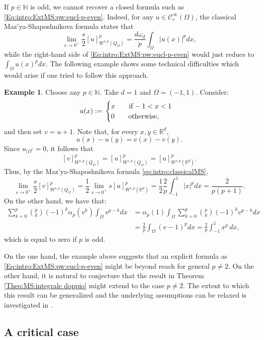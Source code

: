 \documentclass[reqno,11pt]{amsart}
\numberwithin{equation}{section}
\theoremstyle{definition} %
\newtheorem{example}{Example}[section]
\theoremstyle{plain}
\theoremstyle{definition}
\theoremstyle{remark}
\def\C{\mathcal{C}}
\def\Qom{{Q_\Omega}}
\def\O{\Omega}
\def\io{\int_\Omega}
\def\semin#1#2{ [#1 ]_{#2}}
\def\N{\mathbb{N}}
\def\Rd{\mathbb{R}^d}
\newcommand{\abs}[1]{\left|#1\right|}
\begin{document}
If $p\in\N$ is odd, we cannot recover a closed formula such as \eqref{Eq:intro:ExtMS:pw:eucl-p-even}. Indeed, for any $u\in\C^\infty_c(\Omega)$, the classical Maz'ya-Shaposhnikova formula states that
\[
\lim_{s\to0^+}\frac{s}{2}[u]_{W^{s,p}(Q_\O)}^p=\frac{d\omega_d}{p}\io \abs{u(x)}^pdx,
\]
while the right-hand side of \eqref{Eq:intro:ExtMS:pw:eucl-p-even} would just reduce to $\io u(x)^pdx$. The following example shows some technical difficulties which would arise if one tried to follow this approach.
\begin{example}
    \label{poddcounterexample}
    Choose any $p\in\N$. Take $d=1$ and $\O=(-1,1)$. Consider:
    \begin{equation*}
        u(x):=\\
        \begin{cases}
            x\qquad\mathrm{if}-1<x<1\\
            0\qquad\mathrm{otherwise},
        \end{cases}
    \end{equation*}
    and then set $v=u+1$.  Note that, for every $x,y\in\Rd$,
    \[
    u(x)-u(y)=v(x)-v(y).
    \]
    Since $u_{\mid\O^c}=0$, it follows that
    \[
    \semin{v}{W^{s,p}(\Qom)}^p=\semin{u}{W^{s,p}(\Qom)}^p=\semin{u}{W^{s,p}(\Rd)}^p.
    \]
    Thus, by the Maz'ya-Shaposhnikova formula \eqref{eq:intro:classicalMS}, 
    \[
    \lim_{s\to0^+} \frac{s}{2}[v]_{W^{s,p}(\Qom)}^p=
    \frac12\lim_{s\to0^+} s[u]_{W^{s,p}(\Rd)}^p=\frac12\frac{2}{p}\int_{-1}^1\abs{x}^pdx=\frac{2}{p(p+1)}.
    \]
    On the other hand, we have that:
    \begin{align*}
            \sum_{k=0}^p\binom{p}{k}(-1)^k\alpha_p(v^k)\int_\O v^{p-k}dx&=\alpha_p(1)\int_\O\sum_{k=0}^p\binom{p}{k}(-1)^k v^{p-k}dx\\
            &=\frac{2}{p}\int_\O(v-1)^pdx=\frac{2}{p}\int_{-1}^1x^p\,dx,
    \end{align*}
    which is equal to zero if $p$ is odd. 
\end{example}

On the one hand, the example above suggests that an explicit formula as \eqref{Eq:intro:ExtMS:pw:eucl-p-even} might be beyond reach for general $p\neq 2$. 
On the other hand, it is natural to conjecture that the result in Theorem \ref{Theo:MS:integrale doppio} might extend to the case $p\neq2$. The extent to which this result can be generalized and the underlying assumptions can be relaxed is investigated in \cite{DaFaPi2}.

\subsection{A critical case}
\end{document}
